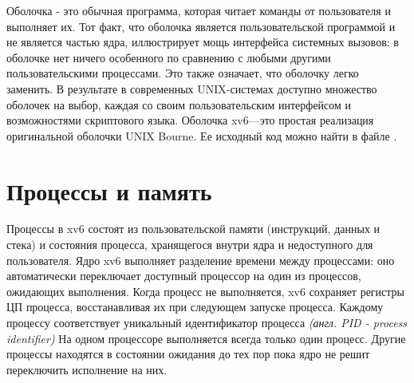 Оболочка - это обычная программа,
которая читает команды от пользователя и выполняет их.
Тот факт, что оболочка является
пользовательской программой и не является частью ядра,
иллюстрирует мощь интерфейса системных вызовов:
в оболочке нет ничего особенного по сравнению
с любыми другими пользовательскими процессами.
Это также означает, что оболочку легко заменить.
В результате в современных UNIX-системах
доступно множество оболочек на выбор,
каждая со своим пользовательским интерфейсом
и возможностями скриптового языка.
Оболочка xv6---это простая реализация
оригинальной оболочки UNIX Bourne.
Ее исходный код можно найти в файле .

\section{Процессы и память}

Процессы в xv6 состоят из пользовательской памяти
(инструкций, данных и стека)
и состояния процесса, хранящегося внутри ядра
и недоступного для пользователя.
Ядро xv6 выполняет разделение времени между процессами:
оно автоматически переключает доступный процессор
на один из процессов, ожидающих выполнения.
Когда процесс не выполняется,
xv6 сохраняет регистры ЦП процесса,
восстанавливая их при следующем запуске процесса.
Каждому процессу соответствует уникальный идентификатор процесса
\emph{(англ. PID - process identifier)}
На одном процессоре выполняется всегда только один процесс.
Другие процессы находятся в состоянии ожидания
до тех пор пока ядро не решит переключить исполнение на них.

